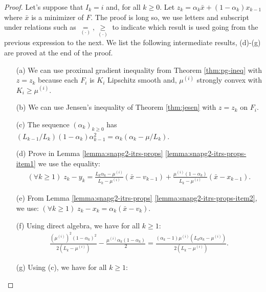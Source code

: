 \documentclass[12pt]{article}
\begin{document}
        \begin{proof}
            Let's suppose that $I_k = i$ and, for all $k \ge 0$. 
            Let $z_k = \alpha_k \bar x + (1 - \alpha_k)x_{k - 1}$ where $\bar x$ is a minimizer of $F$. 
            The proof is long so, we use letters and subscript under relations such as $\underset{(\cdot)}{=}, \underset{(\cdot)}{\ge}$ to indicate which result is used going from the previous expression to the next. 
            We list the following intermediate results, (d)-(g) are proved at the end of the proof. 
            \begin{itemize}
                \item[(a)] We can use proximal gradient inequality from Theorem \ref{thm:pg-ineq} with $z = z_k$ because each $F_i$ is $K_i$ Lipschitz smooth and, $\mu^{(i)}$ strongly convex with $K_i \ge \mu^{(i)}$. 
                \item[(b)] We can use Jensen's inequality of Theorem \ref{thm:jesen} with $z = z_k$ on $F_i$. 
                \item[(c)] The sequence $(\alpha_k)_{k \ge 0}$ has $(L_{k - 1}/L_k)(1 - \alpha_{k})\alpha_{k - 1}^2 = \alpha_{k}\left(\alpha_{k} - \mu/L_k\right)$. 
                \item[(d)] Prove in Lemma \ref{lemma:snapg2-itrs-props} \ref{lemma:snapg2-itrs-props-item1} we use the equality:
                \begin{align*}
                    (\forall k \ge 1)\; 
                    z_k - y_k 
                    = 
                    \frac{L_k\alpha_k - \mu^{(i)}}{L_k - \mu^{(i)}}(\bar x - v_{k - 1})
                    + \frac{\mu^{(i)}(1 - \alpha_k)}{L_k - \mu^{(i)}}(\bar x - x_{k - 1}).
                \end{align*}
                \item [(e)] From Lemma \ref{lemma:snapg2-itrs-props} \ref{lemma:snapg2-itrs-props-item2}, we use: $(\forall k \ge 1)\; z_k - x_k = \alpha_k (\bar x - v_k)$. 
                \item [(f)] Using direct algebra, we have for all $k \ge 1$: 
                \begin{align*}
                    \frac{\left(\mu^{(i)}\right)^2(1 - \alpha_k)^2}{2(L_k - \mu^{(i)})} 
                    - \frac{\mu^{(i)}\alpha_k(1 - \alpha_k)}{2}
                    = \frac{(\alpha_k - 1)\mu^{(i)}\left(L_k\alpha_k - \mu^{(i)}\right)}
                    {2\left(L_k - \mu^{(i)}\right)}. 
                \end{align*}
                \item [(g)] Using (c), we have for all $k \ge 1$: 

\end{itemize}
\end{proof}
\end{document}
